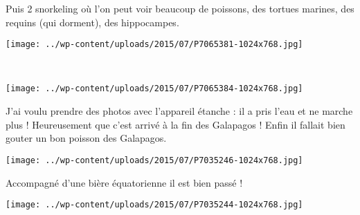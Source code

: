 Puis 2 snorkeling où l'on peut voir beaucoup de poissons, des tortues marines, des requins (qui dorment), des hippocampes. 
\begin{center} \texttt{[image: ../wp-content/uploads/2015/07/P7065381-1024x768.jpg]} \end{center}
~\\
\begin{center} \texttt{[image: ../wp-content/uploads/2015/07/P7065384-1024x768.jpg]} \end{center}
\vspace{-\topsep}
\pagebreak

J'ai voulu prendre des photos avec l'appareil étanche : il a pris l'eau et ne marche plus ! Heureusement que c'est arrivé à la fin des Galapagos !
\vfill
Enfin il fallait bien gouter un bon poisson des Galapagos. 
\vfill
\begin{center} \texttt{[image: ../wp-content/uploads/2015/07/P7035246-1024x768.jpg]} \end{center}
\vfill
Accompagné d'une bière équatorienne il est bien passé ! 
\vfill
\begin{center} \texttt{[image: ../wp-content/uploads/2015/07/P7035244-1024x768.jpg]} \end{center}
\vspace{-\topsep}
\vspace{-0.75mm}
